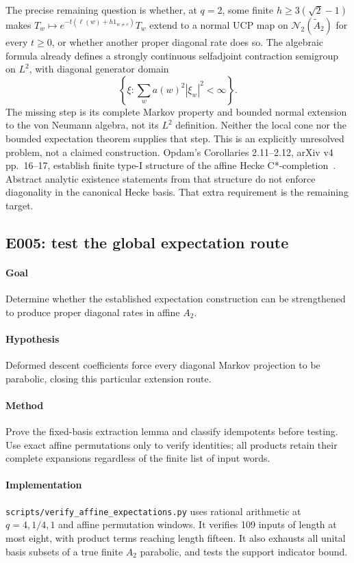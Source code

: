 The precise remaining question is whether, at $q=2$, some finite
$h\geq3(\sqrt2-1)$ makes $T_w\mapsto e^{-t(\ell(w)+h1_{w\ne e})}T_w$
extend to a normal UCP map on $\mathcal N_2(\widetilde A_2)$ for every
$t\geq0$, or whether another proper diagonal rate does so. The algebraic
formula already defines a strongly continuous selfadjoint contraction
semigroup on $L^2$, with diagonal generator domain
\[
 \left\{\xi:\sum_w a(w)^2|\xi_w|^2<\infty\right\}.
\]
The missing step is its complete Markov property and bounded normal
extension to the von Neumann algebra, not its $L^2$ definition. Neither
the local cone nor the bounded expectation theorem supplies that step.
This is an explicitly unresolved problem, not a claimed construction.
Opdam's Corollaries 2.11--2.12, arXiv v4 pp.~16--17, establish finite type-I
structure of the affine Hecke C*-completion~\cite{Opdam2004}. Abstract
analytic existence statements from that structure do not enforce
diagonality in the canonical Hecke basis. That extra requirement is the
remaining target.

\subsection{E005: test the global expectation route}
\paragraph{Goal} Determine whether the established expectation construction
can be strengthened to produce proper diagonal rates in affine $A_2$.
\paragraph{Hypothesis} Deformed descent coefficients force every diagonal
Markov projection to be parabolic, closing this particular extension route.
\paragraph{Method} Prove the fixed-basis extraction lemma and classify
idempotents before testing. Use exact affine permutations only to verify
identities; all products retain their complete expansions regardless of
the finite list of input words.
\paragraph{Implementation} \texttt{scripts/verify\_affine\_expectations.py}
uses rational arithmetic at $q=4,1/4,1$ and affine permutation windows.
It verifies 109 inputs of length at most eight, with product terms reaching
length fifteen. It also exhausts all unital basis subsets of a true finite
$A_2$ parabolic, and tests the support indicator bound.
